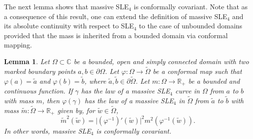\documentclass{article}
\newtheorem{lemma}[theorem]{Lemma}
\theoremstyle{definition}
\theoremstyle{remark}
\theoremstyle{remark}
\begin{document}
The next lemma shows that massive SLE$_4$ is conformally covariant. Note that as a consequence of this result, one can extend the definition of massive SLE$_4$ and its absolute continuity with respect to SLE$_4$ to the case of unbounded domains provided that the mass is inherited from a bounded domain via conformal mapping.

\begin{lemma} \label{lemma_conformal_cov}
Let $\Omega \subset \mathbb{C}$ be a bounded, open and simply connected domain with two marked boundary points $a, b \in \partial \Omega$. Let $\varphi: \Omega \to \tilde \Omega$ be a conformal map such that $\varphi(a)=\tilde a$ and $\varphi(b)= \tilde b$, where $\tilde a, \tilde b \in \partial \tilde \Omega$. Let $m:\Omega \to \mathbb{R}_{+}$ be a bounded and continuous function. If $\gamma$ has the law of a massive SLE$_4$ curve in $\Omega$ from $a$ to $b$ with mass $m$, then $\varphi(\gamma)$ has the law of a massive SLE$_4$ in $\tilde \Omega$ from $\tilde a$ to $\tilde b$ with mass $\tilde m: \tilde \Omega \to \mathbb{R}_{+}$ given by, for $\tilde w \in \tilde \Omega$,
\begin{equation} \label{def_mass_cov}
    \tilde m^2(\tilde w) = \vert (\varphi^{-1})'(\tilde w) \vert^2 m^{2}(\varphi^{-1}(\tilde w)).
\end{equation}
In other words, massive SLE$_4$ is conformally covariant.
\end{lemma}
\end{document}
